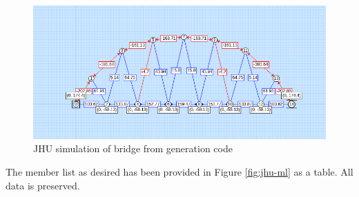 \documentclass{report}
\begin{document}
\begin{figure}[H]
	\centering
	\includegraphics [width=.8\linewidth]{jhu}
	\caption{JHU simulation of bridge from generation code}
	\label{fig:jhu}
\end{figure}

The member list as desired has been provided in Figure \ref{fig:jhu-ml} as a table. All data is preserved.
\end{document}
